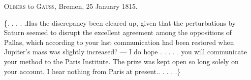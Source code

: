 \par{}\bigskip
\begin{center}
\textsc{Olbers} to \textsc{Gauss}, Bremen, 25 January 1815.
\end{center}
\noindent\hspace*{\parindent}\{. . . . .\quad Has the discrepancy been cleared up, given that the perturbations by Saturn seemed to disrupt the excellent agreement among the oppositions of Pallas, which according to your last communication had been restored when Jupiter's mass was slightly increased? — I do hope . . . . . you will communicate your method to the Paris Institute. The prize was kept open so long solely on your account. I hear nothing from Paris at present.\quad . . . . .\}
\par
